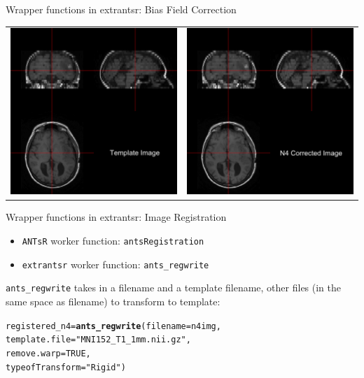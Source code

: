 \documentclass[11pt]{beamer}\usepackage[]{graphicx}\usepackage[]{color}
\makeatletter
\newcommand{\hlnum}[1]{\textcolor[rgb]{0.686,0.059,0.569}{#1}}%
\newcommand{\hlstr}[1]{\textcolor[rgb]{0.192,0.494,0.8}{#1}}%
\newcommand{\hlstd}[1]{\textcolor[rgb]{0.345,0.345,0.345}{#1}}%
\newcommand{\hlkwb}[1]{\textcolor[rgb]{0.69,0.353,0.396}{#1}}%
\newcommand{\hlkwc}[1]{\textcolor[rgb]{0.333,0.667,0.333}{#1}}%
\newcommand{\hlkwd}[1]{\textcolor[rgb]{0.737,0.353,0.396}{\textbf{#1}}}%
\newenvironment{kframe}{%
 \def\at@end@of@kframe{}%
 \ifinner\ifhmode%
  \def\at@end@of@kframe{\end{minipage}}%
  \begin{minipage}{\columnwidth}%
 \fi\fi%
 \def\FrameCommand##1{\hskip\@totalleftmargin \hskip-\fboxsep
 \colorbox{shadecolor}{##1}\hskip-\fboxsep
     \hskip-\linewidth \hskip-\@totalleftmargin \hskip\columnwidth}%
 \MakeFramed {\advance\hsize-\width
   \@totalleftmargin\z@ \linewidth\hsize
   \@setminipage}}%
 {\par\unskip\endMakeFramed%
 \at@end@of@kframe}
\newenvironment{knitrout}{}{} %
\makeatother
\begin{document}
\begin{frame}[fragile]{Wrapper functions in extrantsr: Bias Field Correction}

\begin{tabular}{cc}
\includegraphics[width=0.5\linewidth]{Orig_Image.png} & \includegraphics[width=0.5\linewidth]{N4_Image.png}
\end{tabular}

\end{frame}

\begin{frame}[fragile]{Wrapper functions in extrantsr: Image Registration}

\begin{itemize}
\item \verb|ANTsR| worker function: \verb|antsRegistration|
\item \verb|extrantsr| worker function: \verb|ants_regwrite|
\end{itemize}
\verb|ants_regwrite| takes in a filename and a template filename, other files (in the same space as filename) to transform to template:
\begin{knitrout}
\color{fgcolor}\begin{kframe}
\begin{alltt}
\hlstd{registered_n4} \hlkwb{=} \hlkwd{ants_regwrite}\hlstd{(}\hlkwc{filename}\hlstd{=n4img,}
        \hlkwc{template.file} \hlstd{=} \hlstr{"MNI152_T1_1mm.nii.gz"}\hlstd{,}
        \hlkwc{remove.warp} \hlstd{=} \hlnum{TRUE}\hlstd{,}
        \hlkwc{typeofTransform} \hlstd{=} \hlstr{"Rigid"}\hlstd{)}
\end{alltt}
\end{kframe}
\end{knitrout}
\end{frame}
\end{document}
